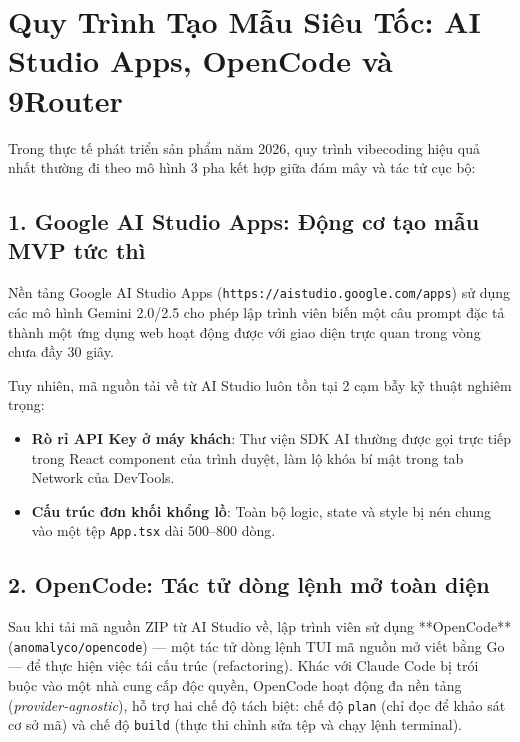 \documentclass[a4paper,11pt]{article}
\begin{document}
\section{Quy Trình Tạo Mẫu Siêu Tốc: AI Studio Apps, OpenCode và 9Router}

Trong thực tế phát triển sản phẩm năm 2026, quy trình vibecoding hiệu quả nhất thường đi theo mô hình 3 pha kết hợp giữa đám mây và tác tử cục bộ:

\subsection{1. Google AI Studio Apps: Động cơ tạo mẫu MVP tức thì}
Nền tảng Google AI Studio Apps (\texttt{https://aistudio.google.com/apps}) sử dụng các mô hình Gemini 2.0/2.5 cho phép lập trình viên biến một câu prompt đặc tả thành một ứng dụng web hoạt động được với giao diện trực quan trong vòng chưa đầy 30 giây. 

Tuy nhiên, mã nguồn tải về từ AI Studio luôn tồn tại 2 cạm bẫy kỹ thuật nghiêm trọng:
\begin{itemize}[leftmargin=1.5em]
    \item \textbf{Rò rỉ API Key ở máy khách}: Thư viện SDK AI thường được gọi trực tiếp trong React component của trình duyệt, làm lộ khóa bí mật trong tab Network của DevTools.
    \item \textbf{Cấu trúc đơn khối khổng lồ}: Toàn bộ logic, state và style bị nén chung vào một tệp \texttt{App.tsx} dài 500--800 dòng.
\end{itemize}

\subsection{2. OpenCode: Tác tử dòng lệnh mở toàn diện}
Sau khi tải mã nguồn ZIP từ AI Studio về, lập trình viên sử dụng **OpenCode** (\texttt{anomalyco/opencode}) --- một tác tử dòng lệnh TUI mã nguồn mở viết bằng Go --- để thực hiện việc tái cấu trúc (refactoring). Khác với Claude Code bị trói buộc vào một nhà cung cấp độc quyền, OpenCode hoạt động đa nền tảng (\textit{provider-agnostic}), hỗ trợ hai chế độ tách biệt: chế độ \texttt{plan} (chỉ đọc để khảo sát cơ sở mã) và chế độ \texttt{build} (thực thi chỉnh sửa tệp và chạy lệnh terminal).
\end{document}
